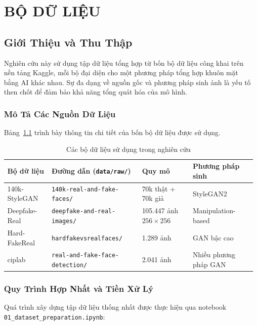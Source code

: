\chapter{BỘ DỮ LIỆU}

\section{Giới Thiệu và Thu Thập}

Nghiên cứu này sử dụng tập dữ liệu tổng hợp từ bốn bộ dữ liệu công khai trên nền tảng Kaggle, mỗi bộ đại diện cho một phương pháp tổng hợp khuôn mặt bằng AI khác nhau. Sự đa dạng về nguồn gốc và phương pháp sinh ảnh là yếu tố then chốt để đảm bảo khả năng tổng quát hóa của mô hình.

\subsection{Mô Tả Các Nguồn Dữ Liệu}

Bảng~\ref{tab:datasets} trình bày thông tin chi tiết của bốn bộ dữ liệu được sử dụng.

\begin{table}[H]
  \centering
  \caption{Các bộ dữ liệu sử dụng trong nghiên cứu}
  \label{tab:datasets}
  \begin{tabularx}{\linewidth}{lXll}
    \toprule
    \textbf{Bộ dữ liệu} & \textbf{Đường dẫn (\texttt{data/raw/})} & \textbf{Quy mô} & \textbf{Phương pháp sinh} \\
    \midrule
    140k-StyleGAN  & \texttt{140k-real-and-fake-faces/} & 70k thật + 70k giả & StyleGAN2 \\
    Deepfake-Real  & \texttt{deepfake-and-real-images/}  & 105.447 ảnh $256{\times}256$ & Manipulation-based \\
    Hard-FakeReal  & \texttt{hardfakevsrealfaces/}        & 1.289 ảnh & GAN bậc cao \\
    ciplab         & \texttt{real-and-fake-face-detection/} & 2.041 ảnh & Nhiều phương pháp GAN \\
    \bottomrule
  \end{tabularx}
\end{table}

\subsection{Quy Trình Hợp Nhất và Tiền Xử Lý}

Quá trình xây dựng tập dữ liệu thống nhất được thực hiện qua notebook \texttt{01\_dataset\_preparation.ipynb}:

